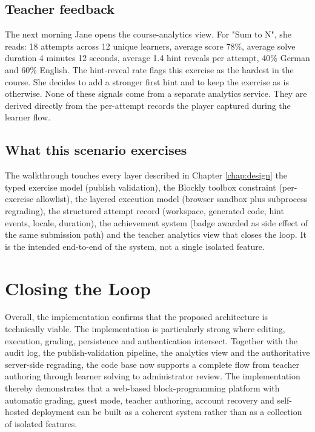 \subsection*{Teacher feedback}
The next morning Jane opens the course-analytics view. For "Sum to N", she reads: 18 attempts across 12 unique learners, 
average score 78\%, average solve duration 4 minutes 12 seconds, average 1.4 hint reveals per attempt, 
40\% German and 60\% English. The hint-reveal rate flags this exercise as the hardest in the course. She decides to add a 
stronger first hint and to keep the exercise as is otherwise. None of these signals come from a separate analytics service. 
They are derived directly from the per-attempt records the player captured during the learner flow.

\subsection*{What this scenario exercises}
The walkthrough touches every layer described in Chapter \ref{chap:design} the typed exercise model (publish validation), 
the Blockly toolbox constraint (per-exercise allowlist), the layered execution model (browser sandbox plus subprocess regrading), 
the structured attempt record (workspace, generated code, hint events, locale, duration), 
the achievement system (badge awarded as side effect of the same submission path) and the teacher analytics
view that closes the loop. It is the intended end-to-end of the system, not a single isolated feature.


\section{Closing the Loop}
\label{sec:closing-the-loop}
Overall, the implementation confirms that the proposed architecture is technically viable.
The implementation is particularly strong where editing, execution, grading, persistence and authentication intersect.
Together with the audit log, the publish-validation pipeline, the analytics view and the authoritative server-side regrading, 
the code base now supports a complete flow from teacher authoring through learner solving to administrator review.
The implementation thereby demonstrates that a web-based block-programming platform with automatic grading, guest mode, 
teacher authoring, account recovery and self-hosted deployment can be built as a coherent system rather than as a 
collection of isolated features.

